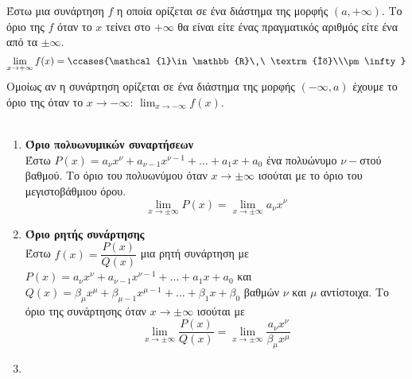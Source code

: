 \documentclass[twoside,nofonts,ektypwsh,math,spyros]{frontisthrio}
\begin{document}
\orismoi
{}
Έστω μια συνάρτηση $ f $ η οποία ορίζεται σε ένα διάστημα της μορφής $ (a,+\infty) $. Το όριο της $ f $ όταν το $ x $ τείνει στο $ +\infty $ θα είναι είτε ένας πραγματικός αριθμός είτε ένα από τα $ \pm\infty $.
\[ \displaystyle{\lim_{x\rightarrow+\infty}f(x)=\ccases{\mathcal{l}\in\mathbb{R}\ \ \textrm{ή}\\\pm\infty}} \]
Ομοίως αν η συνάρτηση ορίζεται σε ένα διάστημα της μορφής $ (-\infty,a) $ έχουμε το όριο της όταν το $ x\to-\infty $: $ {\displaystyle{\lim_{x\rightarrow-\infty}{f(x)}}} $.\\\\
\thewrhmata
{}
\vspace{-5mm}
\begin{enumerate}[label=\bf\arabic*.]
\item \textbf{Όριο πολυωνυμικών συναρτήσεων}\\
Έστω $ P(x)=a_\nu x^\nu+a_{\nu-1}x^{\nu-1}+\ldots+a_1x+a_0 $ ένα πολυώνυμο $ \nu- $στού βαθμού. Το όριο του πολυωνύμου όταν $ x\to\pm\infty $ ισούται με το όριο του μεγιστοβάθμιου όρου.
\[ \lim_{x\rightarrow\pm\infty}{P(x)}=\lim_{x\rightarrow\pm\infty}{a_\nu x^\nu} \]
\item \textbf{Όριο ρητής συνάρτησης}\\
Έστω $ f(x)=\dfrac{P(x)}{Q(x)} $ μια ρητή συνάρτηση με $ P(x)=a_\nu x^\nu+a_{\nu-1}x^{\nu-1}+\ldots+a_1x+a_0 $ και $ Q(x)=\beta_\mu x^\mu+\beta_{\mu-1}x^{\mu-1}+\ldots+\beta_1x+\beta_0 $ βαθμών $ \nu $ και $ \mu $ αντίστοιχα. Το όριο της συνάρτησης όταν $ x\to\pm\infty $ ισούται με 
\[ \displaystyle{\lim_{x\rightarrow\pm\infty}\frac{P(x)}{Q(x)}=\lim_{x\rightarrow\pm\infty}\frac{a_\nu x^\nu}{\beta_\mu x^\mu}} \]
\item {}
\begin{multicols}{2}
\begin{enumerate}[itemsep=0mm,label=\alph*.]

\end{enumerate}
\end{multicols}
\end{enumerate}
\end{document}
